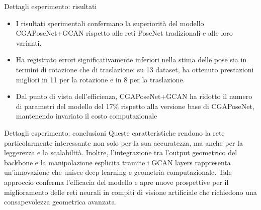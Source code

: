 \begin{frame}{Dettagli esperimento: risultati}
   \begin{itemize}
      \item I risultati sperimentali confermano la superiorità del modello CGAPoseNet+GCAN rispetto alle reti PoseNet tradizionali e alle loro varianti.
      \item Ha registrato errori significativamente inferiori nella stima delle pose sia in termini di rotazione che di traslazione: su 13 dataset, ha ottenuto prestazioni migliori in 11 per la rotazione e in 8 per la traslazione.
      \item Dal punto di vista dell’efficienza, CGAPoseNet+GCAN ha ridotto il numero di parametri del modello del 17\% rispetto alla versione base di CGAPoseNet, mantenendo invariato il costo computazionale
   \end{itemize}
\end{frame}
   
\begin{frame}{Dettagli esperimento: conclusioni}
   Queste caratteristiche rendono la rete particolarmente interessante non solo per la sua accuratezza, ma anche per la leggerezza e la scalabilità.
    Inoltre, l’integrazione tra l’output geometrico del backbone e la manipolazione esplicita tramite i GCAN layers rappresenta un’innovazione che unisce deep learning e geometria computazionale. 
    Tale approccio conferma l’efficacia del modello e apre nuove prospettive per il miglioramento delle reti neurali in compiti di visione artificiale che richiedono una consapevolezza geometrica avanzata.
\end{frame}